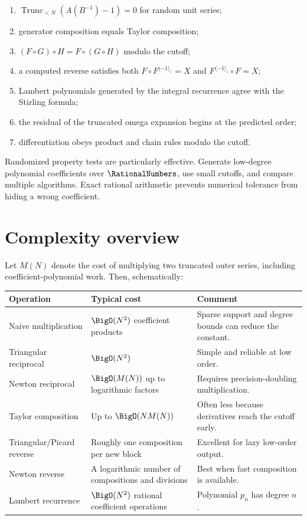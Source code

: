 \documentclass[11pt,oneside,openany]{book}
\newcommand{\TransseriesTruncateBelow}[2]{%
  \operatorname{Trunc}_{<#2}\!\left(#1\right)%
}
\newcommand{\compose}{\mathbin{\circ}}
\newcommand{\rev}{^{\langle-1\rangle_{\circ}}}
\begin{document}
\begin{enumerate}
\item \(\TransseriesTruncateBelow{A(B^{-1})-1}{N}=0\) for random unit series;
\item generator composition equals Taylor composition;
\item \((F\compose G)\compose H=F\compose(G\compose H)\) modulo the cutoff;
\item a computed reverse satisfies both \(F\compose F\rev=X\) and
\(F\rev\compose F=X\);
\item Lambert polynomials generated by the integral recurrence agree with the
Stirling formula;
\item the residual of the truncated omega expansion begins at the predicted
order;
\item differentiation obeys product and chain rules modulo the cutoff.
\end{enumerate}

Randomized property tests are particularly effective.  Generate low-degree
polynomial coefficients over \(\RationalNumbers\), use small cutoffs, and compare
multiple algorithms.  Exact rational arithmetic prevents numerical tolerance
from hiding a wrong coefficient.

\section{Complexity overview}
Let \(M(N)\) denote the cost of multiplying two truncated outer series,
including coefficient-polynomial work.  Then, schematically:

\begin{center}
\begin{tabularx}{0.94\textwidth}{@{}>{\raggedright\arraybackslash}p{}>{\raggedright\arraybackslash}p{}X@{}}
\toprule
Operation & Typical cost & Comment \\
\midrule
Naive multiplication & \(\BigO(N^2)\) coefficient products
& Sparse support and degree bounds can reduce the constant. \\
Triangular reciprocal & \(\BigO(N^2)\)
& Simple and reliable at low order. \\
Newton reciprocal & \(\BigO(M(N))\) up to logarithmic factors
& Requires precision-doubling multiplication. \\
Taylor composition & Up to \(\BigO(NM(N))\)
& Often less because derivatives reach the cutoff early. \\
Triangular/Picard reverse & Roughly one composition per new block
& Excellent for lazy low-order output. \\
Newton reverse & A logarithmic number of compositions and divisions
& Best when fast composition is available. \\
Lambert recurrence & \(\BigO(N^2)\) rational coefficient operations
& Polynomial \(p_n\) has degree \(n\). \\
\bottomrule
\end{tabularx}
\end{center}
\end{document}
